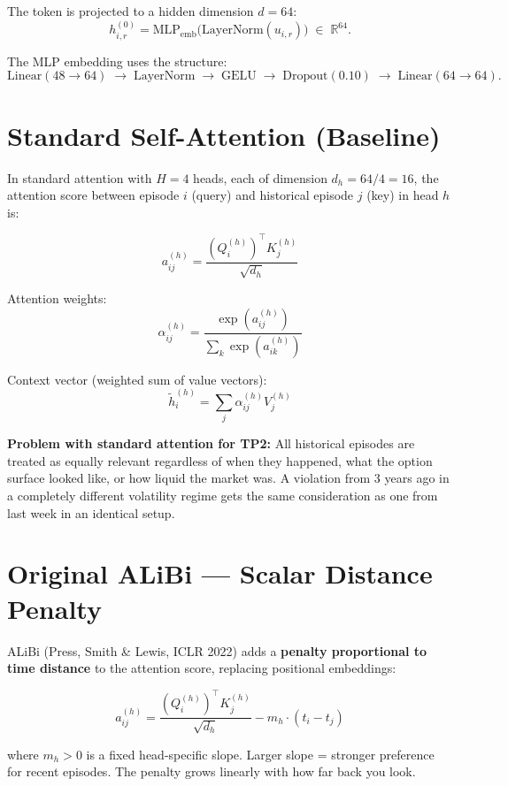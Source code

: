 \documentclass[11pt]{article}
\newcommand{\R}{\mathbb{R}}
\newcommand{\1}{\mathbf{1}}
\begin{document}
The token is projected to a hidden dimension $d = 64$:
\[
  h_{i,r}^{(0)}
  =
  \mathrm{MLP}_{\mathrm{emb}}\!\bigl(\mathrm{LayerNorm}(u_{i,r})\bigr)
  \;\in\; \R^{64}.
\]

The MLP embedding uses the structure:
\[
  \mathrm{Linear}(48 \to 64) \;\to\; \mathrm{LayerNorm} \;\to\; \mathrm{GELU}
  \;\to\; \mathrm{Dropout}(0.10) \;\to\; \mathrm{Linear}(64 \to 64).
\]

\section{Standard Self-Attention (Baseline)}

In standard attention with $H = 4$ heads, each of dimension
$d_h = 64 / 4 = 16$, the attention score between episode $i$ (query)
and historical episode $j$ (key) in head $h$ is:

\[
  a_{ij}^{(h)}
  =
  \frac{(Q_i^{(h)})^\top K_j^{(h)}}{\sqrt{d_h}}
\]

Attention weights:
\[
  \alpha_{ij}^{(h)}
  =
  \frac{\exp(a_{ij}^{(h)})}{\displaystyle\sum_{k} \exp(a_{ik}^{(h)})}
\]

Context vector (weighted sum of value vectors):
\[
  \tilde{h}_i^{(h)}
  =
  \sum_j \alpha_{ij}^{(h)} V_j^{(h)}
\]

\textbf{Problem with standard attention for TP2:} All historical episodes
are treated as equally relevant regardless of when they happened, what the
option surface looked like, or how liquid the market was. A violation from
3 years ago in a completely different volatility regime gets the same
consideration as one from last week in an identical setup.

\section{Original ALiBi --- Scalar Distance Penalty}

ALiBi (Press, Smith \& Lewis, ICLR 2022) adds a \textbf{penalty proportional
to time distance} to the attention score, replacing positional embeddings:

\[
  a_{ij}^{(h)}
  =
  \frac{(Q_i^{(h)})^\top K_j^{(h)}}{\sqrt{d_h}}
  - m_h \cdot (t_i - t_j)
\]

where $m_h > 0$ is a fixed head-specific slope. Larger slope = stronger
preference for recent episodes. The penalty grows linearly with how far back
you look.
\end{document}
